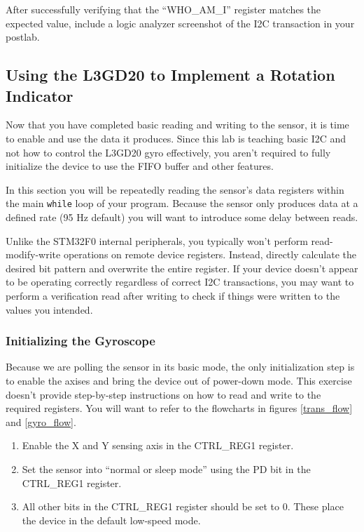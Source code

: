 \documentclass[11pt,fleqn]{book} %
\begin{document}
After successfully verifying that the ``WHO\_AM\_I'' register matches the expected value, include a logic analyzer screenshot of the I2C transaction in your postlab.
 
\subsection{Using the L3GD20 to Implement a Rotation Indicator}
Now that you have completed basic reading and writing to the sensor, it is time to enable and use the data it produces. Since this lab is teaching basic I2C and not how to control the L3GD20 gyro effectively, you aren't required to fully initialize the device to use the FIFO buffer and other features.

In this section you will be repeatedly reading the sensor's data registers within the main \texttt{while} loop of your program. Because the sensor only produces data at a defined rate (95 Hz default) you will want to introduce some delay between reads.

Unlike the STM32F0 internal peripherals, you typically won't perform read-modify-write operations on remote device registers. Instead, directly calculate the desired bit pattern and overwrite the entire register. If your device doesn't appear to be operating correctly regardless of correct I2C transactions, you may want to perform a verification read after writing to check if things were written to the values you intended. 

\subsubsection{Initializing the Gyroscope}
Because we are polling the sensor in its basic mode, the only initialization step is to enable the axises and bring the device out of power-down mode. This exercise doesn't provide step-by-step instructions on how to read and write to the required registers. You will want to refer to the flowcharts in figures \ref{trans_flow} and \ref{gyro_flow}.

\begin{enumerate}
    \item Enable the X and Y sensing axis in the CTRL\_REG1 register.
    \item Set the sensor into ``normal or sleep mode'' using the PD bit in the CTRL\_REG1 register.
    \item All other bits in the CTRL\_REG1 register should be set to 0. These place the device in the default low-speed mode.
\end{enumerate} 
\end{document}
